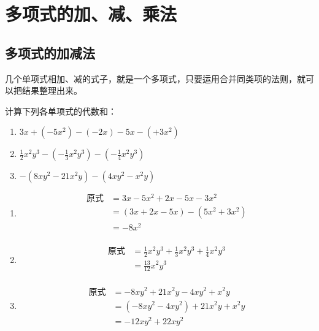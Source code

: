 \section{多项式的加、减、乘法}
\subsection{多项式的加减法}
几个单项式相加、减的式子，就是一个多项式，只要运用合并同类项的法则，就可以把结果整理出来。

\begin{example}
    计算下列各单项式的代数和：
\begin{enumerate}
    \item $3x+(-5x^2)-(-2x)-5x-(+3x^2)$
    \item $\frac{1}{2}x^2y^3-\left(-\frac{1}{3}x^2y^3\right)-\left(-\frac{1}{4}x^2y^3\right)$
    \item $-(8xy^2-21x^2y)-(4xy^2-x^2y)$
\end{enumerate}
\end{example}

\begin{solution}
    \begin{enumerate}
        \item \begin{align*}
            \text{原式}&=3x-5x^2+2x-5x-3x^2 \tag{去括号}\\
            &=(3x+2x-5x)-(5x^2+3x^2)\tag{交换、结合律}\\
            &=-8x^2 \tag{合并同类项法则}\\
        \end{align*}
        \item \begin{align*}
            \text{原式}&=\frac{1}{2}x^2y^3+\frac{1}{3}x^2y^3+\frac{1}{4}x^2y^3\tag{去括号}\\
            &=\frac{13}{12}x^2y^3  \tag{合并同类项法则}\\
        \end{align*}
        \item \begin{align*}
            \text{原式}&=-8xy^2+21x^2y-4xy^2+x^2y\\
            &=(-8xy^2-4xy^2)+21x^2y+x^2y\\
            &=-12xy^2+22xy^2
        \end{align*}
    \end{enumerate}
\end{solution}

